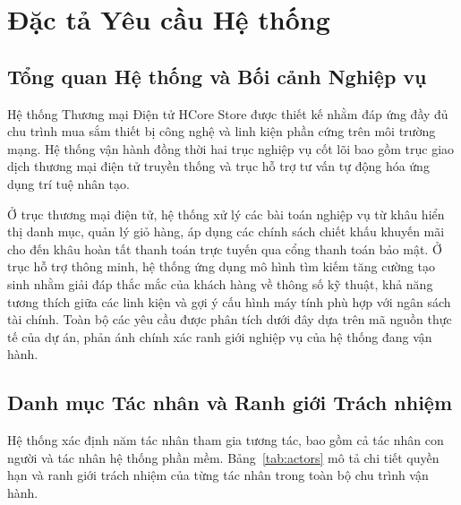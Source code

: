 \chapter{Đặc tả Yêu cầu Hệ thống}

\section{Tổng quan Hệ thống và Bối cảnh Nghiệp vụ}
Hệ thống Thương mại Điện tử HCore Store được thiết kế nhằm đáp ứng đầy đủ chu trình mua sắm thiết bị công nghệ và linh kiện phần cứng trên môi trường mạng. Hệ thống vận hành đồng thời hai trục nghiệp vụ cốt lõi bao gồm trục giao dịch thương mại điện tử truyền thống và trục hỗ trợ tư vấn tự động hóa ứng dụng trí tuệ nhân tạo.

Ở trục thương mại điện tử, hệ thống xử lý các bài toán nghiệp vụ từ khâu hiển thị danh mục, quản lý giỏ hàng, áp dụng các chính sách chiết khấu khuyến mãi cho đến khâu hoàn tất thanh toán trực tuyến qua cổng thanh toán bảo mật. Ở trục hỗ trợ thông minh, hệ thống ứng dụng mô hình tìm kiếm tăng cường tạo sinh nhằm giải đáp thắc mắc của khách hàng về thông số kỹ thuật, khả năng tương thích giữa các linh kiện và gợi ý cấu hình máy tính phù hợp với ngân sách tài chính. Toàn bộ các yêu cầu được phân tích dưới đây dựa trên mã nguồn thực tế của dự án, phản ánh chính xác ranh giới nghiệp vụ của hệ thống đang vận hành.

\section{Danh mục Tác nhân và Ranh giới Trách nhiệm}
Hệ thống xác định năm tác nhân tham gia tương tác, bao gồm cả tác nhân con người và tác nhân hệ thống phần mềm. Bảng~\ref{tab:actors} mô tả chi tiết quyền hạn và ranh giới trách nhiệm của từng tác nhân trong toàn bộ chu trình vận hành.

